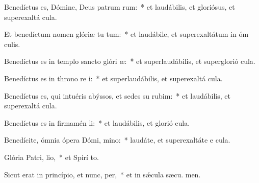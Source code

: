\item Benedíctus es, Dómine, Deus patrum rum:~* et laudábilis, et gloriósus, et superexaltá  cula.

\item Et benedíctum nomen glóriæ tu tum:~* et laudábile, et superexaltátum in óm culis.

\item Benedíctus es in templo sancto glóri æ:~* et superlaudábilis, et superglorió  cula.

\item Benedíctus es in throno re i:~* et superlaudábilis, et superexaltá  cula.

\item Benedíctus es, qui intuéris abýssos, et sedes su rubim:~* et laudábilis, et superexaltá  cula.

\item Benedíctus es in firmamén li:~* et laudábilis, et glorió  cula.

\item Benedícite, ómnia ópera Dómi, mino:~* laudáte, et superexaltáte e  cula.

\item Glória Patri,  lio,~* et Spirí to.

\item Sicut erat in princípio, et nunc,  per,~* et in sǽcula sæcu. men.